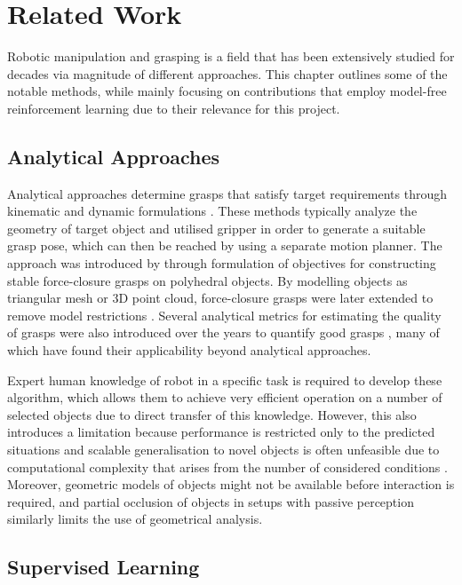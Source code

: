 \chapter{Related Work}\label{ch:related_work}

Robotic manipulation and grasping is a field that has been extensively studied for decades via magnitude of different approaches. This chapter outlines some of the notable methods, while mainly focusing on contributions that employ model-free reinforcement learning due to their relevance for this project.


\section{Analytical Approaches}

Analytical approaches determine grasps that satisfy target requirements through kinematic and dynamic formulations \cite{sahbani_overview_2012}. These methods typically analyze the geometry of target object and utilised gripper in order to generate a suitable grasp pose, which can then be reached by using a separate motion planner. The approach was introduced by \citet{nguyen_constructing_1987} through formulation of objectives for constructing stable force-closure grasps on polyhedral objects. By modelling objects as triangular mesh or 3D point cloud, force-closure grasps were later extended to remove model restrictions \cite{yun-hui_liu_complete_2004}. Several analytical metrics for estimating the quality of grasps were also introduced over the years to quantify good grasps \cite{roa_grasp_2015}, many of which have found their applicability beyond analytical approaches.

Expert human knowledge of robot in a specific task is required to develop these algorithm, which allows them to achieve very efficient operation on a number of selected objects due to direct transfer of this knowledge. However, this also introduces a limitation because performance is restricted only to the predicted situations and scalable generalisation to novel objects is often unfeasible due to computational complexity that arises from the number of considered conditions \cite{sahbani_overview_2012}. Moreover, geometric models of objects might not be available before interaction is required, and partial occlusion of objects in setups with passive perception similarly limits the use of geometrical analysis.


\section{Supervised Learning}

